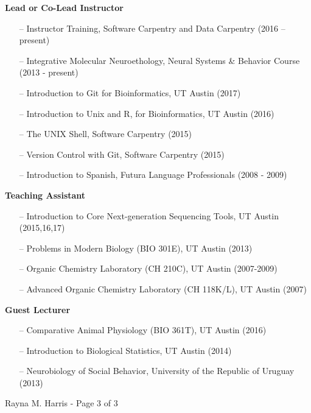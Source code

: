 \documentclass[margin,line]{resume}
\begin{document}
\begin{resume}
\begin{itemize}
\end{itemize}

{\bf Lead or Co-Lead Instructor }
\begin{itemize}
\raggedright
\item[--] Instructor Training, Software Carpentry and Data Carpentry (2016 – present)
\item[--] Integrative Molecular Neuroethology, Neural Systems \& Behavior Course (2013 - present)
\item[--] Introduction to Git for Bioinformatics, UT Austin (2017)
\item[--] Introduction to Unix and R, for Bioinformatics, UT Austin (2016)
\item[--] The UNIX Shell, Software Carpentry (2015)
\item[--] Version Control with Git, Software Carpentry (2015)
\item[--] Introduction to Spanish, Futura Language Professionals (2008 - 2009)
\end{itemize}

{\bf Teaching Assistant}
\begin{itemize}
\item[--] Introduction to Core Next-generation Sequencing Tools, UT Austin (2015,16,17)
\item[--] Problems in Modern Biology (BIO 301E), UT Austin (2013)
\item[--] Organic Chemistry Laboratory (CH 210C), UT Austin (2007-2009)
\item[--] Advanced Organic Chemistry Laboratory (CH 118K/L), UT Austin (2007)
\end{itemize}

{\bf Guest Lecturer}
\begin{itemize}
\item[--] Comparative Animal Physiology (BIO 361T), UT Austin (2016)
\item[--] Introduction to Biological Statistics, UT Austin (2014)
\item[--] Neurobiology of Social Behavior, University of the Republic of Uruguay (2013)
\end{itemize}




\vspace{0.3 cm}
{\centerline {Rayna M. Harris - Page 3 of 3}}

\end{resume}
\end{document}
